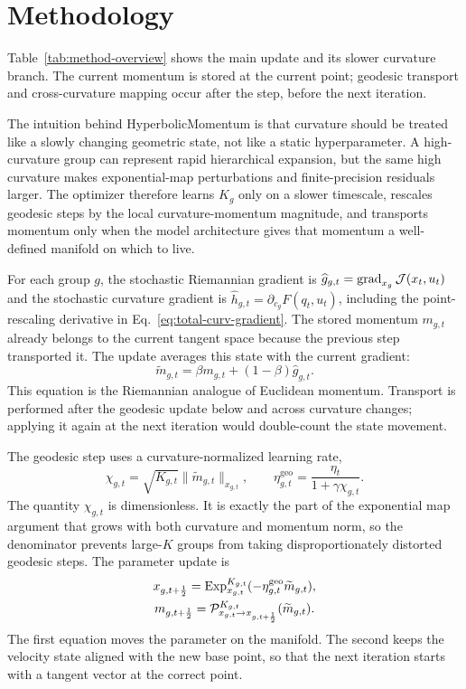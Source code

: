 \section{Methodology}
\label{sec:methodology}
Table~\ref{tab:method-overview} shows the main update and its slower curvature branch. The current momentum is stored at the current point; geodesic transport and cross-curvature mapping occur after the step, before the next iteration.


The intuition behind HyperbolicMomentum is that curvature should be treated like a slowly changing geometric state, not like a static hyperparameter. A high-curvature group can represent rapid hierarchical expansion, but the same high curvature makes exponential-map perturbations and finite-precision residuals larger. The optimizer therefore learns $K_g$ only on a slower timescale, rescales geodesic steps by the local curvature-momentum magnitude, and transports momentum only when the model architecture gives that momentum a well-defined manifold on which to live.

For each group $g$, the stochastic Riemannian gradient is $\widehat g_{g,t}=\operatorname{grad}_{x_g}\mathcal{J}(x_t,u_t)$ and the stochastic curvature gradient is $\widehat h_{g,t}=\partial_{c_g}F(q_t,u_t)$, including the point-rescaling derivative in Eq.~\eqref{eq:total-curv-gradient}. The stored momentum $m_{g,t}$ already belongs to the current tangent space because the previous step transported it. The update averages this state with the current gradient:
\begin{equation}
\widetilde m_{g,t}=\beta m_{g,t}+(1-\beta)\widehat g_{g,t}.
\label{eq:momentum-main}
\end{equation}
This equation is the Riemannian analogue of Euclidean momentum. Transport is performed after the geodesic update below and across curvature changes; applying it again at the next iteration would double-count the state movement.

The geodesic step uses a curvature-normalized learning rate,
\begin{equation}
\chi_{g,t}=\sqrt{K_{g,t}}\|\widetilde m_{g,t}\|_{x_{g,t}},\qquad
\eta^{\mathrm{geo}}_{g,t}=\frac{\eta_t}{1+\gamma\chi_{g,t}}.
\label{eq:eta-main}
\end{equation}
The quantity $\chi_{g,t}$ is dimensionless. It is exactly the part of the exponential map argument that grows with both curvature and momentum norm, so the denominator prevents large-$K$ groups from taking disproportionately distorted geodesic steps. The parameter update is
\begin{equation}
\begin{gathered}
x_{g,t+\frac12}=\operatorname{Exp}_{x_{g,t}}^{K_{g,t}}(-\eta^{\mathrm{geo}}_{g,t}\widetilde m_{g,t}),\\
m_{g,t+\frac12}=\mathcal{P}_{x_{g,t}\to x_{g,t+\frac12}}^{K_{g,t}}(\widetilde m_{g,t}).
\end{gathered}
\label{eq:x-step-main}
\end{equation}
The first equation moves the parameter on the manifold. The second keeps the velocity state aligned with the new base point, so that the next iteration starts with a tangent vector at the correct point.

